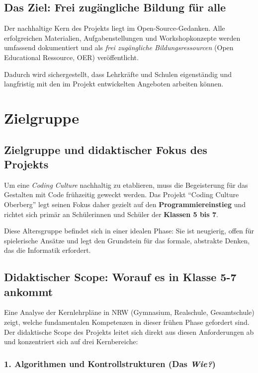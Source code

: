 \documentclass[a5paper,pagesize,10pt,bibtotoc,pointlessnumbers,
normalheadings,DIV=9,twoside=false]{scrbook}
\begin{document}
\subsection*{Das Ziel: Frei zugängliche Bildung für alle}

Der nachhaltige Kern des Projekts liegt im Open-Source-Gedan\-ken. Alle erfolgreichen Materialien, Aufgabenstellungen und Workshopkonzepte werden umfassend dokumentiert und als \textit{frei zugängliche Bildungsressourcen} (Open Educational Ressource, OER) veröffentlicht.

Dadurch wird sichergestellt, dass Lehrkräfte und Schulen eigenständig und langfristig mit den im Projekt entwickelten Angeboten arbeiten können.

\section*{Zielgruppe}

\subsection*{Zielgruppe und didaktischer Fokus des Projekts}

Um eine \textit{Coding Culture} nachhaltig zu etablieren, muss die Begeisterung für das Gestalten mit Code frühzeitig geweckt werden. Das Projekt ``Coding Culture Oberberg'' legt seinen Fokus daher gezielt auf den \textbf{Programmiereinstieg} und richtet sich primär an Schülerinnen und Schüler der \textbf{Klassen 5 bis 7}.

Diese Altersgruppe befindet sich in einer idealen Phase: Sie ist neugierig, offen für spielerische Ansätze und legt den Grundstein für das formale, abstrakte Denken, das die Informatik erfordert.

\subsection*{Didaktischer Scope: Worauf es in Klasse 5-7 ankommt}

Eine Analyse der Kernlehrpläne in NRW (Gymnasium, Realschule, Gesamtschule) zeigt, welche fundamentalen Kompetenzen in dieser frühen Phase gefordert sind. Der didaktische Scope des Projekts leitet sich direkt aus diesen Anforderungen ab und konzentriert sich auf drei Kernbereiche:

\subsubsection{1. Algorithmen und Kontrollstrukturen (Das \textit{Wie?})}
\end{document}
